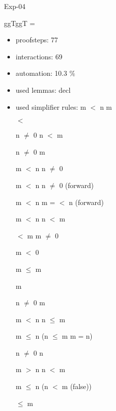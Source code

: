 \documentclass[a4paper]{article}
\begin{document}
\raggedright
              



\begin{minipage}{\textwidth}
\begin{center}

\end{center}
\end{minipage}

\vspace{5ex}

{\Huge Exp-04}

\vspace{5ex}

 \Fol \Do ggT\Dc \Do ggT\Dc {} = 

\begin{itemize}
\item proofsteps: 77
\item interactions: 69
\item automation: 10.3 \%
\item used lemmas: decl 
\item used simplifier rules:
 \Fol m $<$ n \Imp m %

$<$

n $\neq$ 0 \Fol \Not n $<$ m %

n $\neq$ 0 \Fol m %

 \Fol m $<$ n \Imp n $\neq$ 0

 \Fol m $<$ n \Imp n $\neq$ 0 (forward)

 \Fol m $<$ n \And m =  \Imp {} $<$ n (forward)

 \Fol m $<$ n \Imp \Not n $<$ m

  $<$ m \Equiv m $\neq$ 0

 \Fol \Not m $<$ 0

 \Fol m $\le$ m

 \Fol m %

n $\neq$ 0 \Fol m %

 \Fol \Not m $<$ n \Equiv n $\le$ m

 \Fol m $\le$ n \Imp (n $\le$ m \Equiv m = n)

n $\neq$ 0 \Fol n %

 \Fol m $>$ n \Equiv n $<$ m

 \Fol m $\le$ n \Imp (n $<$ m \Equiv (false))

  $\le$ m



               \end{itemize}
\end{document}
